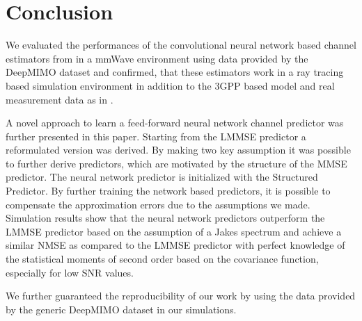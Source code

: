 \documentclass[12pt, draftclsnofoot, onecolumn]{IEEEtran}
\begin{document}
\section{Conclusion}
We evaluated the performances of the convolutional neural network based channel estimators from \cite{Neumann} in a mmWave environment using data provided by the DeepMIMO dataset and confirmed, that these estimators work in a ray tracing based simulation environment in addition to the 3GPP based model and real measurement data as in \cite{Hellings}. 

A novel approach to learn a feed-forward neural network channel predictor was further presented in this paper. Starting from the LMMSE predictor a reformulated version was derived. By making two key assumption it was possible to further derive predictors, which are motivated by the structure of the MMSE predictor. The neural network predictor is initialized with the Structured Predictor. By further training the network based predictors, it is possible to compensate the approximation errors due to the assumptions we made. Simulation results show that the neural network predictors outperform the LMMSE predictor based on the assumption of a Jakes spectrum and achieve a similar NMSE as compared to the LMMSE predictor with perfect knowledge of the statistical moments of second order based on the covariance function, especially for low SNR values.

We further guaranteed the reproducibility of our work by using the data provided by the generic DeepMIMO dataset in our simulations. 
\vfill
\end{document}
